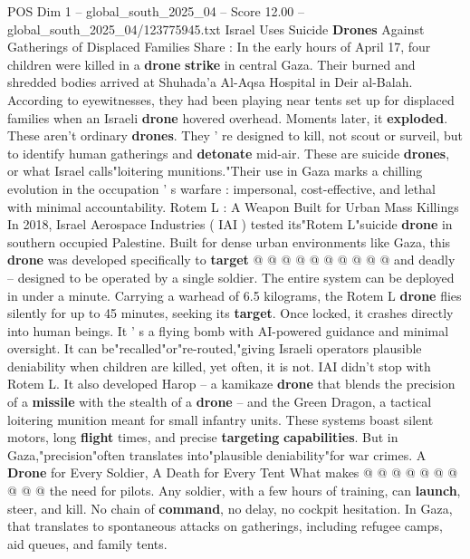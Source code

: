 \begin{textsample}{POS Dim 1 – global\_south\_2025\_04 – Score 12.00 – global\_south\_2025\_04/123775945.txt}  \label{ex:f1_pos_327}
Israel Uses Suicide \textbf{Drones} Against Gatherings of Displaced Families Share : In the early hours of April 17, four children were killed in a \textbf{drone} \textbf{strike} in central Gaza.
Their burned and shredded bodies arrived at Shuhada'a Al-Aqsa Hospital in Deir al-Balah.
According to eyewitnesses, they had been playing near tents set up for displaced families when an Israeli \textbf{drone} hovered overhead.
Moments later, it \textbf{exploded}.
These aren't ordinary \textbf{drones}.
They ' re designed to kill, not scout or surveil, but to identify human gatherings and \textbf{detonate} mid-air.
These are suicide \textbf{drones}, or what Israel calls"loitering munitions."Their use in Gaza marks a chilling evolution in the occupation ' s warfare : impersonal, cost-effective, and lethal with minimal accountability.
Rotem L : A Weapon Built for Urban Mass Killings In 2018, Israel Aerospace Industries ( IAI ) tested its"Rotem L"suicide \textbf{drone} in southern occupied Palestine.
Built for dense urban environments like Gaza, this \textbf{drone} was developed specifically to \textbf{target} @ @ @ @ @ @ @ @ @ @ and deadly -- designed to be operated by a single soldier.
The entire system can be deployed in under a minute.
Carrying a warhead of 6.5 kilograms, the Rotem L \textbf{drone} flies silently for up to 45 minutes, seeking its \textbf{target}.
Once locked, it crashes directly into human beings.
It ' s a flying bomb with AI-powered guidance and minimal oversight.
It can be"recalled"or"re-routed,"giving Israeli operators plausible deniability when children are killed, yet often, it is not.
IAI didn't stop with Rotem L.
It also developed Harop -- a kamikaze \textbf{drone} that blends the precision of a \textbf{missile} with the stealth of a \textbf{drone} -- and the Green Dragon, a tactical loitering munition meant for small infantry units.
These systems boast silent motors, long \textbf{flight} times, and precise \textbf{targeting} \textbf{capabilities}.
But in Gaza,"precision"often translates into"plausible deniability"for war crimes.
A \textbf{Drone} for Every Soldier, A Death for Every Tent What makes @ @ @ @ @ @ @ @ @ @ the need for pilots.
Any soldier, with a few hours of training, can \textbf{launch}, steer, and kill.
No chain of \textbf{command}, no delay, no cockpit hesitation.
In Gaza, that translates to spontaneous attacks on gatherings, including refugee camps, aid queues, and family tents.

\end{textsample}
